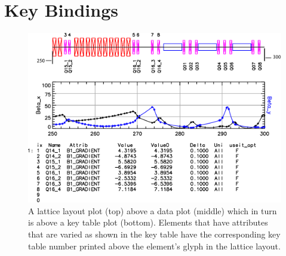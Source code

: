 \section{Key Bindings}
\label{s:key.bind}

\begin{figure}
  \centering
  \includegraphics[width=5in]{layout-graph-table.pdf}
  \caption[Example key table with a lattice layout and data plots.]
{A lattice layout plot (top) above a data plot (middle) which in turn is above a key table plot
(bottom). Elements that have attributes that are varied as shown in the key table have the
corresponding key table number printed above the element's glyph in the lattice layout.}
  \label{f:key.table}
\end{figure}

